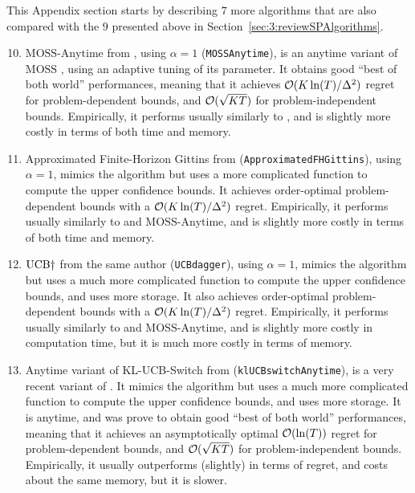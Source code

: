 This Appendix section starts by describing $7$ more algorithms that are also compared with the $9$ presented above in Section~\ref{sec:3:reviewSPAlgorithms}.

\begin{enumerate}
    \setcounter{enumi}{9}
    \item
    $\mathrm{MOSS}$-$\mathrm{Anytime}$ from \cite{Degenne16}, using $\alpha=1$ (\texttt{MOSSAnytime}),
    is an anytime variant of $\mathrm{MOSS}$ \cite{BubeckSlivkins12}, using an adaptive tuning of its parameter. It obtains good ``best of both world'' performances, meaning that it achieves $\mathcal{O}(K\ln(T)/\Delta^2)$ regret for problem-dependent bounds, and $\mathcal{O}(\sqrt{KT})$ for problem-independent bounds.
    Empirically, it performs usually similarly to \UCB, and is slightly more costly in terms of both time and memory.

    \item
    Approximated Finite-Horizon Gittins from \cite{Lattimore16a} (\texttt{ApproximatedFHGittins}), using $\alpha=1$,
    mimics the \UCB{} algorithm but uses a more complicated function to compute the upper confidence bounds.
    It achieves order-optimal problem-dependent bounds with a $\mathcal{O}(K\ln(T)/\Delta^2)$ regret.
    Empirically, it performs usually similarly to \UCB{} and $\mathrm{MOSS}$-$\mathrm{Anytime}$, and is slightly more costly in terms of both time and memory.

    \item
    $\mathrm{UCB}\dagger$ from the same author \cite{Lattimore2018refining} (\texttt{UCBdagger}), using $\alpha=1$,
    mimics the \UCB{} algorithm but uses a much more complicated function to compute the upper confidence bounds, and uses more storage.
    It also achieves order-optimal problem-dependent bounds with a $\mathcal{O}(K\ln(T)/\Delta^2)$ regret.
    Empirically, it performs usually similarly to \UCB{} and $\mathrm{MOSS}$-$\mathrm{Anytime}$, and is slightly more costly in computation time, but it is much more costly in terms of memory.

    \item
    Anytime variant of KL-UCB-Switch from \cite{GarivierHadiji2018}
    (\texttt{klUCBswitchAnytime}),
    is a very recent variant of \KLUCB{} \cite{KLUCBJournal}.
    It mimics the \KLUCB{} algorithm but uses a much more complicated function to compute the upper confidence bounds, and uses more storage.
    It is anytime, and was prove to obtain good ``best of both world'' performances, meaning that it achieves an asymptotically optimal $\mathcal{O}(\ln(T))$ regret for problem-dependent bounds, and $\mathcal{O}(\sqrt{KT})$ for problem-independent bounds.
    Empirically, it usually outperforms (slightly) \klUCB{} in terms of regret, and costs about the same memory, but it is slower.


\end{enumerate}

